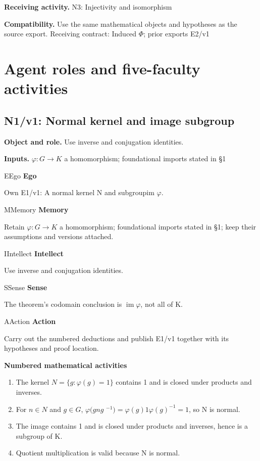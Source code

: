\documentclass[preprint,12pt,aps,pra,showkeys,amsmath,amssymb,superscriptaddress,floatfix]{revtex4-2}
\theoremstyle{definition}
\theoremstyle{remark}
\newcommand{\mmfaculty}[3]{%
 \begin{mmfacultybox}{#1}{#2}
 {\sffamily\bfseries\color{MMBlue}#2}\par\smallskip #3
 \end{mmfacultybox}}
\newcommand{\field}[2]{\par\smallskip\noindent\textbf{#1.} #2\par}
\begin{document}
\field{Receiving activity}{N3: Injectivity and isomorphism}

\field{Compatibility}{Use the same mathematical objects and hypotheses as the source export.
Receiving contract: Induced \(\Phi\); prior exports E2/v1}

\endgroup

\clearpage\section{Agent roles and five-faculty activities}\begingroup\small\linespread{1.05}\selectfont{}

\subsection{N1/v1: Normal kernel and image subgroup}

\field{Object and role}{Use inverse and conjugation identities.}

\field{Inputs}{\(\varphi :G\to K\) a homomorphism; foundational imports stated in §1}

\mmfaculty{E}{Ego}{Own E1/v1: A normal kernel N and subgroupim \(\varphi\).}

\mmfaculty{M}{Memory}{Retain \(\varphi :G\to K\) a homomorphism; foundational imports stated
in §1; keep their assumptions and versions attached.}

\mmfaculty{I}{Intellect}{Use inverse and conjugation identities.}

\mmfaculty{S}{Sense}{The theorem's codomain conclusion is \(\operatorname{im} \varphi\), not
all of K.}

\mmfaculty{A}{Action}{Carry out the numbered deductions and publish E1/v1 together with its
hypotheses and proof location.}

\smallskip\noindent\textbf{Numbered mathematical activities}

\begin{enumerate}[label=N1.\arabic*,leftmargin=3.4em]

\item The kernel \(N=\{g:\varphi (g)=1\}\) contains 1 and is closed under
products and inverses.

\item For \(n\in N\) and \(g\in G\), \(\varphi (gng\)
\(^{-1})=\varphi (g)1\varphi (g)^{-1}=1\), so N is normal.

\item The image contains 1 and is closed under products and inverses, hence is
a subgroup of K.

\item Quotient multiplication is valid because N is normal.

\end{enumerate}
\end{document}
